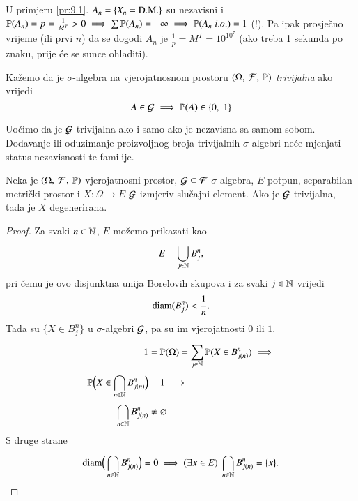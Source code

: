 \begin{nap} \label{nap:9.4}
    U primjeru \ref{pr:9.1}. $A_n = \{ X_n = \textnormal{D.M.} \}$ su nezavisni i $\mathbb{P}({A_n}) = p = \frac{1}{M^T} > 0 \implies \sum \mathbb{P}({A_n}) = +\infty \implies \mathbb{P}({A_n \; i.o.}) = 1$ (!).
    Pa ipak prosje\v cno vrijeme (ili prvi $n$) da se dogodi $A_n$ je $\frac{1}{p} = M^T = 10^{10^7}$ (ako treba 1 sekunda po znaku, prije \' ce se sunce ohladiti).
\end{nap}

\begin{defn}    \label{defn:9.5}
    Ka\v zemo da je $\sigma$-algebra na vjerojatnosnom prostoru $(\Omega, \: \mathcal{F}, \: \mathbb{P})$ \emph{trivijalna} ako vrijedi
    \begin{equation*}
        A \in \mathcal{G} \implies \mathbb{P}({A}) \in \{0, \; 1\}
    \end{equation*}
\end{defn}

Uo\v cimo da je $\mathcal{G}$ trivijalna ako i samo ako je nezavisna sa samom sobom.
Dodavanje ili oduzimanje proizvoljnog broja trivijalnih $\sigma$-algebri ne\' ce mjenjati status nezavisnosti te familije.

\begin{lm}  \label{lm:9.6}
    Neka je $(\Omega, \: \mathcal{F}, \: \mathbb{P})$ vjerojatnosni prostor, $\mathcal{G} \subseteq \mathcal{F}$ $\sigma$-algebra, $E$ potpun, separabilan metri\v cki prostor i $X : \Omega \to E$ $\mathcal{G}$-izmjeriv slu\v cajni element.
    Ako je $\mathcal{G}$ trivijalna, tada je $X$ degenerirana.
\end{lm}

\begin{proof}
    Za svaki $n \in \mathbb{N}$, $E$ mo\v zemo prikazati kao
    \begin{equation*}
        E = \bigcup\limits_{j \in \mathbb{N}}^{} B_j^n,
    \end{equation*}
    pri \v cemu je ovo disjunktna unija Borelovih skupova i za svaki $j \in \mathbb{N}$ vrijedi
    \begin{equation*}
        \mathrm{diam}(B_j^n) < \frac{1}{n}.
    \end{equation*}
    Tada su $\{ X \in B_j^n \}$ u $\sigma$-algebri $\mathcal{G}$, pa su im vjerojatnosti $0$ ili $1$.
    \begin{equation*}
        \begin{aligned}
            1 &= \mathbb{P}({\Omega}) = \sum\limits_{j \in \mathbb{N}}^{} \mathbb{P}({X \in B_{j(n)}^n}) \implies\\
            \mathbb{P} \Big( X \in \bigcap\limits_{n \in \mathbb{N}}^{} B_{j(n)}^n \Big) &= 1 \implies\\
            \bigcap\limits_{n \in \mathbb{N}}^{} B_{j(n)}^n &\neq \varnothing
        \end{aligned}
    \end{equation*}
    S druge strane
    \begin{equation*}
        \mathrm{diam}\Big( \bigcap\limits_{n \in \mathbb{N}}^{}B_{j(n)}^n \Big) = 0 \implies (\exists x \in E) \; \bigcap\limits_{n \in \mathbb{N}}^{} B_{j(n)}^n = \{ x \}.
    \end{equation*}
\end{proof}

